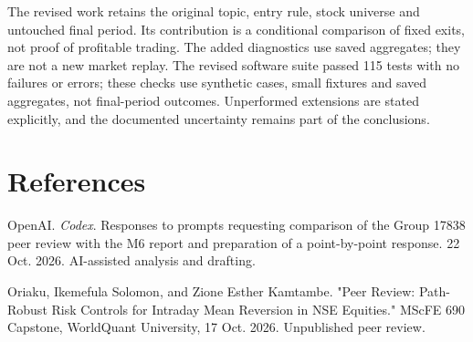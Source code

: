 \documentclass[11pt,a4paper]{article}
\begin{document}
The revised work retains the original topic, entry rule, stock universe and untouched final period. Its contribution is a conditional comparison of fixed exits, not proof of profitable trading. The added diagnostics use saved aggregates; they are not a new market replay. The revised software suite passed 115 tests with no failures or errors; these checks use synthetic cases, small fixtures and saved aggregates, not final-period outcomes. Unperformed extensions are stated explicitly, and the documented uncertainty remains part of the conclusions.
\section*{References}
{\RaggedRight\hangindent=1.27cm\noindent OpenAI. \textit{Codex}. Responses to prompts requesting comparison of the Group 17838 peer review with the M6 report and preparation of a point-by-point response. 22 Oct. 2026. AI-assisted analysis and drafting.\par}
{\RaggedRight\hangindent=1.27cm\noindent Oriaku, Ikemefula Solomon, and Zione Esther Kamtambe. "Peer Review: Path-Robust Risk Controls for Intraday Mean Reversion in NSE Equities." MScFE 690 Capstone, WorldQuant University, 17 Oct. 2026. Unpublished peer review.\par}
\end{document}
